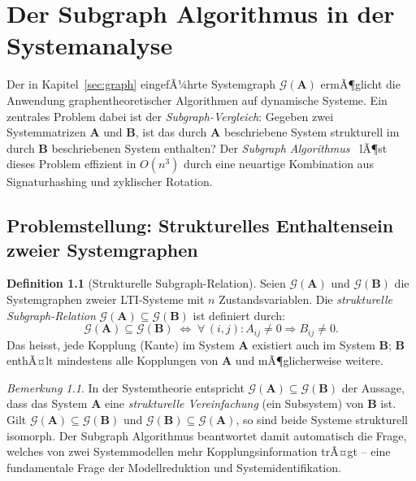 ﻿\documentclass[12pt, a4paper, titlepage]{report}
\theoremstyle{definition}
\newtheorem{definition}[theorem]{Definition}
\theoremstyle{remark}
\newtheorem{remark}[theorem]{Bemerkung}
\newcommand{\vA}{\bm{A}}
\newcommand{\vB}{\bm{B}}
\begin{document}
\chapter{Der Subgraph Algorithmus in der Systemanalyse}
\label{sec:subgraph}

Der in Kapitel~\ref{sec:graph} eingefÃ¼hrte Systemgraph $\mathcal{G}(\vA)$ ermÃ¶glicht
die Anwendung graphentheoretischer Algorithmen auf dynamische Systeme. Ein zentrales
Problem dabei ist der \emph{Subgraph-Vergleich}: Gegeben zwei Systemmatrizen
$\vA$ und $\vB$, ist das durch $\vA$ beschriebene System strukturell im durch $\vB$
beschriebenen System enthalten? Der \emph{Subgraph Algorithmus}~\citep{epp2026subgraph}
lÃ¶st dieses Problem effizient in $O(n^3)$ durch eine neuartige Kombination aus
Signaturhashing und zyklischer Rotation.

\section{Problemstellung: Strukturelles Enthaltensein zweier Systemgraphen}

\begin{definition}[Strukturelle Subgraph-Relation]
\label{def:subgraph_rel}
Seien $\mathcal{G}(\vA)$ und $\mathcal{G}(\vB)$ die Systemgraphen zweier
LTI-Systeme mit $n$ Zustandsvariablen. Die \emph{strukturelle Subgraph-Relation}
$\mathcal{G}(\vA) \subseteq \mathcal{G}(\vB)$ ist definiert durch:
\begin{equation}
  \mathcal{G}(\vA) \subseteq \mathcal{G}(\vB)
  \;\Longleftrightarrow\;
  \forall\,(i,j): A_{ij} \neq 0 \Rightarrow B_{ij} \neq 0.
  \label{eq:subgraph_rel}
\end{equation}
Das heisst, jede Kopplung (Kante) im System $\vA$ existiert auch im System $\vB$;
$\vB$ enthÃ¤lt mindestens alle Kopplungen von $\vA$ und mÃ¶glicherweise weitere.
\end{definition}

\begin{remark}
In der Systemtheorie entspricht $\mathcal{G}(\vA) \subseteq \mathcal{G}(\vB)$ der
Aussage, dass das System $\vA$ eine \emph{strukturelle Vereinfachung} (ein
Subsystem) von $\vB$ ist. Gilt $\mathcal{G}(\vA) \subseteq \mathcal{G}(\vB)$
und $\mathcal{G}(\vB) \subseteq \mathcal{G}(\vA)$, so sind beide Systeme strukturell
isomorph. Der Subgraph Algorithmus beantwortet damit automatisch die Frage, welches
von zwei Systemmodellen mehr Kopplungsinformation trÃ¤gt -- eine fundamentale Frage
der Modellreduktion und Systemidentifikation.
\end{remark}
\end{document}
